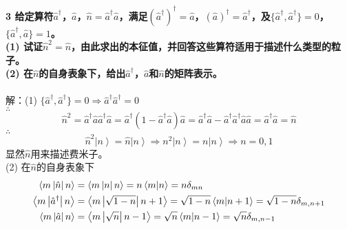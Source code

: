 \documentclass[12pt]{article}
\numberwithin{equation}{section}	 %
\begin{document}
\begin{spacing}{1.5}
\textbf{3 \quad 给定算符$\hat{a}^{\dag}$，$\hat{a}$，$\hat{n}=\hat{a}^{\dag}\hat{a}$，满足$\displaystyle (\hat{a}^{\dag})^{\dag}=\hat{a}$，$\displaystyle (\hat{a})^{\dag}=\hat{a}^{\dag}$，及$\{\hat{a}^{\dag},\hat{a}^{\dag}\}=0$，$\{\hat{a}^{\dag},\hat{a}\}=1$。\\
(1) 试证$\hat{n}^{2} = \hat{n}$，由此求出的本征值，并回答这些算符适用于描述什么类型的粒子。\\
(2) 在$\hat{n}$的自身表象下，给出$\hat{a}^{\dag}$，$\hat{a}$和$\hat{n}$的矩阵表示。}\\
~\\
解：(1) $\displaystyle \{\hat{a}^{\dag},\hat{a}^{\dag}\}=0 \Rightarrow \hat{a}^{\dag}\hat{a}^{\dag}=0$\\
$\therefore$
\begin{equation}
\hat{n}^{2} = \hat{a}^{\dag}\hat{a}\hat{a}^{\dag}\hat{a} = \hat{a}^{\dag}\left( 1-\hat{a}^{\dag}\hat{a} \right)\hat{a} = \hat{a}^{\dag}\hat{a}-\hat{a}^{\dag}\hat{a}^{\dag}\hat{a}\hat{a} = \hat{a}^{\dag}\hat{a} = \hat{n}
\end{equation}
$\therefore$
\begin{equation}
\hat{n}^{2}\left|n\right> = \hat{n}\left|n\right> \Rightarrow n^{2}\left|n\right> = n\left|n\right> \Rightarrow n=0,1
\end{equation}
显然$\hat{n}$用来描述费米子。\\
(2) 在$\hat{n}$的自身表象下
\begin{align}
\left<m\left|\hat{n}\right|n\right> &= \left<m\left|n\right|n\right>=n\left<m|n\right> =n\delta_{mn} \notag \\
\left<m\left|\hat{a}^{\dag}\right|n\right> &= \left<m\left|\sqrt{1-n}\right|n+1\right> =\sqrt{1-n}\left<m|n+1\right> = \sqrt{1-n}\delta_{m,n+1} \notag \\
\left<m\left|\hat{a}\right|n\right> &= \left<m\left|\sqrt{n}\right|n-1\right> =\sqrt{n}\left<m|n-1\right> = \sqrt{n}\delta_{m,n-1} \notag 
\end{align}


\end{spacing}
\end{document}
